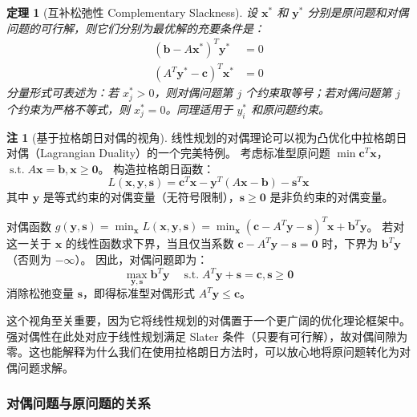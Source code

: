 \documentclass[12pt]{article}
\theoremstyle{plain}
\newtheorem{thm}{定理}[subsection]
\theoremstyle{definition}
\newtheorem{rmk}{注}[subsection]
\newcommand{\st}{\mathrel{\text{s.t.}}}
\begin{document}
\begin{thm}[互补松弛性 Complementary Slackness]
    设 $\bm{x}^*$ 和 $\bm{y}^*$ 分别是原问题和对偶问题的可行解，则它们分别为最优解的充要条件是：
    \begin{align*}
        (\bm{b} - A\bm{x}^*)^T \bm{y}^* &= 0 \\
        (A^T \bm{y}^* - \bm{c})^T \bm{x}^* &= 0
    \end{align*}
    分量形式可表述为：若 $x_j^* > 0$，则对偶问题第 $j$ 个约束取等号；若对偶问题第 $j$ 个约束为严格不等式，则 $x_j^* = 0$。同理适用于 $y_i^*$ 和原问题约束。
\end{thm}

\begin{rmk}[基于拉格朗日对偶的视角]
    线性规划的对偶理论可以视为凸优化中拉格朗日对偶（Lagrangian Duality）的一个完美特例。
    考虑标准型原问题 $\min \bm{c}^T \bm{x}$，$\st A\bm{x} = \bm{b}, \bm{x} \geq \bm{0}$。
    构造拉格朗日函数：
    \[ L(\bm{x}, \bm{y}, \bm{s}) = \bm{c}^T \bm{x} - \bm{y}^T (A\bm{x} - \bm{b}) - \bm{s}^T \bm{x} \]
    其中 $\bm{y}$ 是等式约束的对偶变量（无符号限制），$\bm{s} \geq \bm{0}$ 是非负约束的对偶变量。
    
    对偶函数 $\displaystyle g(\bm{y}, \bm{s}) = \min_{\bm{x}} L(\bm{x}, \bm{y}, \bm{s}) = \min_{\bm{x}} (\bm{c} - A^T \bm{y} - \bm{s})^T \bm{x} + \bm{b}^T \bm{y}$。
    若对这一关于 $\bm{x}$ 的线性函数求下界，当且仅当系数 $\bm{c} - A^T \bm{y} - \bm{s} = \bm{0}$ 时，下界为 $\bm{b}^T \bm{y}$（否则为 $-\infty$）。
    因此，对偶问题即为：
    \[ \max_{\bm{y}, \bm{s}} \bm{b}^T \bm{y} \quad \st A^T \bm{y} + \bm{s} = \bm{c}, \bm{s} \geq \bm{0} \]
    消除松弛变量 $\bm{s}$，即得标准型对偶形式 $A^T \bm{y} \leq \bm{c}$。
    
    这个视角至关重要，因为它将线性规划的对偶置于一个更广阔的优化理论框架中。强对偶性在此处对应于线性规划满足 Slater 条件（只要有可行解），故对偶间隙为零。这也能解释为什么我们在使用拉格朗日方法时，可以放心地将原问题转化为对偶问题求解。
\end{rmk}

\subsubsection{对偶问题与原问题的关系}
\end{document}
